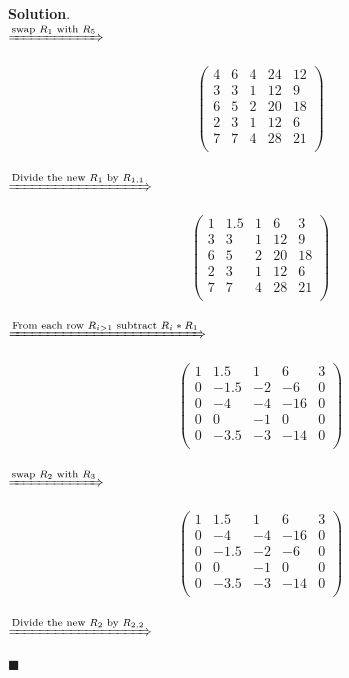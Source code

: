 \documentclass[12pt]{article}
\renewcommand{\=}[1]{\stackrel{#1}{=}} %
\theoremstyle{definition}
\newenvironment{s}{%
        \begin{trivlist} \item \textbf{Solution}. }{%
            \hspace*{\fill} $\blacksquare$\end{trivlist}}%
\begin{document}
\begin{s} \newline \\
  $\xRightarrow{\text{swap $R_1$ with $R_5$}}$
  
  \[
    \begin{pmatrix}
      4 & 6 & 4 & 24 & 12 \\
      3 & 3 & 1 & 12 & 9  \\
      6 & 5 & 2 & 20 & 18 \\
      2 & 3 & 1 & 12 & 6  \\
      7 & 7 & 4 & 28 & 21 \\
    \end{pmatrix}
  \]
  \\
  $\xRightarrow{\text{Divide the new $R_1$ by $R_{1,1}$}}$
  
  \[
    \begin{pmatrix}
      1 & 1.5 & 1 & 6 & 3 \\
      3 & 3 & 1 & 12 & 9  \\
      6 & 5 & 2 & 20 & 18 \\
      2 & 3 & 1 & 12 & 6  \\
      7 & 7 & 4 & 28 & 21 \\
    \end{pmatrix}
  \]
  \\
  $\xRightarrow{\text{From each row $R_{i > 1}$ subtract $R_i * R_1$}}$
  
  \[
    \begin{pmatrix}
      1 & 1.5 & 1 & 6 & 3 \\
      0 & -1.5 & -2   & -6 & 0  \\
      0 & -4 & -4 & -16  & 0 \\
      0 & 0 & -1 & 0  & 0  \\
      0 & -3.5 & -3 & -14  & 0 \\
    \end{pmatrix}
  \]
  \\
  $\xRightarrow{\text{swap $R_2$ with $R_3$}}$
  
  \[
    \begin{pmatrix}
      1 & 1.5 & 1 & 6 & 3 \\
      0 & -4 & -4 & -16  & 0 \\
      0 & -1.5 & -2   & -6 & 0  \\
      0 & 0 & -1 & 0  & 0  \\
      0 & -3.5 & -3 & -14  & 0 \\
    \end{pmatrix}
  \]
  \\
  $\xRightarrow{\text{Divide the new $R_2$ by $R_{2,2}$}}$
  

\end{s}
\end{document}
